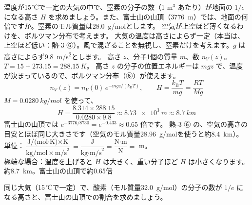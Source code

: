 \label{ph:熱-15:ex6}
\begin{phreidai}
温度が15\,℃で一定の大気の中で、窒素の分子の数（1 m$^3$ あたり）が地面の $1/e$ になる高さ $H$ を求めましょう。また、富士山の山頂（\qty{3776}{m}）では、地面の何倍ですか。窒素のモル質量は\qty{28.0}{g/mol}とします。
\phbamen
空気が上空ほど薄くなるわけを、ボルツマン分布で考えます。
\phmushi
大気の温度は高さによらず一定（本当は、上空ほど低い：熱-3 ⑥）。風で混ざることを無視し、窒素だけを考えます。$g$ は高さによらず\qty{9.8}{m/s^2}とします。
\phzu
高さ $z$、分子1個の質量 $m$、数 $n_V(z)$。$T=15+273.15=\qty{288.15}{K}$。
\phriyu
高さ $z$ の分子の位置エネルギーは $mgz$ で、温度が決まっているので、ボルツマン分布（⑥）が使えます。
\phtateru
\[n_V(z)=n_V(0)\,e^{-mgz/(k_{\mathrm B}T)},\qquad H=\frac{k_{\mathrm B}T}{mg}=\frac{RT}{Mg}\]
\phtoku
$M=\qty{0.0280}{kg/mol}$ を使って、
\[H=\frac{8.314\times288.15}{0.0280\times9.8}\approx\qty{8.73e3}{m}\approx\qty{8.7}{km}\]
富士山の山頂では $e^{-3776/8730}=e^{-0.433}\approx0.65$ 倍です。
\phtashikame
熱-3 ⑥ の、空気の高さの目安とほぼ同じ大きさです（空気のモル質量\qty{28.96}{g/mol}を使うと約\qty{8.4}{km}）。\\
単位：$\dfrac{\text{J/(mol·K)}\times\text{K}}{\text{kg/mol}\times\text{m/s}^2}=\dfrac{\text{J}}{\text{kg·m/s}^2}=\dfrac{\text{N·m}}{\text{N}}=$ m。\\
極端な場合：温度を上げると $H$ は大きく、重い分子ほど $H$ は小さくなります。
\kotae 約\qty{8.7}{km}。富士山の山頂で約0.65倍
\end{phreidai}
\begin{jibun}
同じ大気（15\,℃で一定）で、酸素（モル質量\qty{32.0}{g/mol}）の分子の数が $1/e$ になる高さと、富士山の山頂での割合を求めましょう。
\end{jibun}

